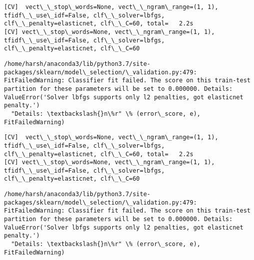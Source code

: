 \documentclass[11pt]{article}
\begin{document}
    \begin{Verbatim}[commandchars=\\\{\}]
[CV]  vect\_\_stop\_words=None, vect\_\_ngram\_range=(1, 1), tfidf\_\_use\_idf=False, clf\_\_solver=lbfgs, clf\_\_penalty=elasticnet, clf\_\_C=60, total=   2.2s
[CV] vect\_\_stop\_words=None, vect\_\_ngram\_range=(1, 1), tfidf\_\_use\_idf=False, clf\_\_solver=lbfgs, clf\_\_penalty=elasticnet, clf\_\_C=60 

    \end{Verbatim}

    \begin{Verbatim}[commandchars=\\\{\}]
/home/harsh/anaconda3/lib/python3.7/site-packages/sklearn/model\_selection/\_validation.py:479: FitFailedWarning: Classifier fit failed. The score on this train-test partition for these parameters will be set to 0.000000. Details: 
ValueError('Solver lbfgs supports only l2 penalties, got elasticnet penalty.')
  "Details: \textbackslash{}n\%r" \% (error\_score, e), FitFailedWarning)

    \end{Verbatim}

    \begin{Verbatim}[commandchars=\\\{\}]
[CV]  vect\_\_stop\_words=None, vect\_\_ngram\_range=(1, 1), tfidf\_\_use\_idf=False, clf\_\_solver=lbfgs, clf\_\_penalty=elasticnet, clf\_\_C=60, total=   2.2s
[CV] vect\_\_stop\_words=None, vect\_\_ngram\_range=(1, 1), tfidf\_\_use\_idf=False, clf\_\_solver=lbfgs, clf\_\_penalty=elasticnet, clf\_\_C=60 

    \end{Verbatim}

    \begin{Verbatim}[commandchars=\\\{\}]
/home/harsh/anaconda3/lib/python3.7/site-packages/sklearn/model\_selection/\_validation.py:479: FitFailedWarning: Classifier fit failed. The score on this train-test partition for these parameters will be set to 0.000000. Details: 
ValueError('Solver lbfgs supports only l2 penalties, got elasticnet penalty.')
  "Details: \textbackslash{}n\%r" \% (error\_score, e), FitFailedWarning)

    \end{Verbatim}
\end{document}
